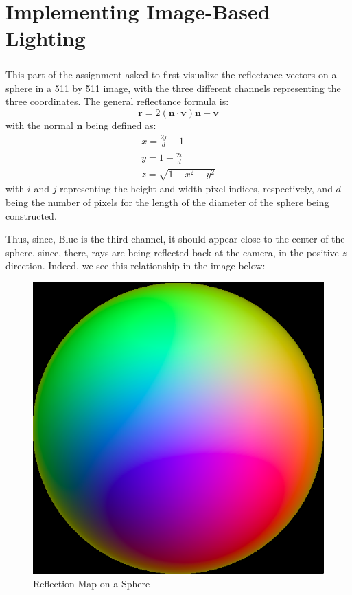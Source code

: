 \documentclass[a4paper,12pt,oneside,final]{report}
\newenvironment{changemargin}[2]{\begin{list}{}{%
\setlength{\topsep}{0pt}%
\setlength{\leftmargin}{0pt}%
\setlength{\rightmargin}{0pt}%
\setlength{\listparindent}{\parindent}%
\setlength{\itemindent}{\parindent}%
\setlength{\parsep}{0pt plus 1pt}%
\addtolength{\leftmargin}{#1}%
\addtolength{\rightmargin}{#2}%
}\item }{\end{list}}
\begin{document}
\FloatBarrier

\chapter{Implementing Image-Based Lighting}
\paragraph{}
This part of the assignment asked to first visualize the reflectance vectors on a sphere in a 511 by 511 image, with the three different channels representing the three coordinates.  The general reflectance formula is:
$$
\mathbf{r} = 2(\mathbf{n}\cdot\mathbf{v})\mathbf{n} - \mathbf{v}
$$
with the normal $\mathbf{n}$ being defined as:
\begin{eqnarray}
x = \frac{2j}{d} - 1\\
y = 1 - \frac{2i}{d} \\
z = \sqrt{1 - x^2 - y^2}
\end{eqnarray}
with $i$ and $j$ representing the height and width pixel indices, respectively, and $d$ being the number of pixels for the length of the diameter of the sphere being constructed.

Thus, since, Blue is the third channel, it should appear close to the center of the sphere, since, there, rays are being reflected back at the camera, in the positive $z$ direction.  Indeed, we see this relationship in the image below:
\begin{figure}[!h]
\begin{changemargin}{-50mm}{-50mm}
\center
\includegraphics[scale=0.5]{reflectance_map.png}
\caption{Reflection Map on a Sphere}
\end{changemargin}
\end{figure}
\end{document}
